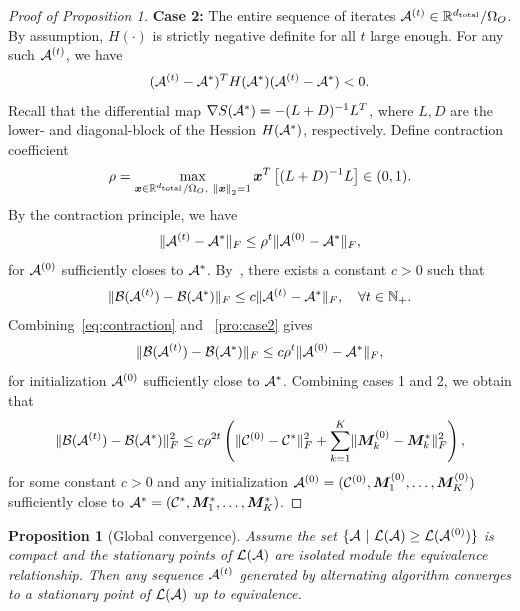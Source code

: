 \documentclass[11pt]{article}
\theoremstyle{plain}
\newtheorem{prop}{Proposition}
\theoremstyle{definition}
\begin{document}
\begin{proof}[Proof of Proposition 1]
\textbf{Case 2:} The entire sequence of iterates $\mathcal{A}^{(t)} \in \mathbb{R}^{d_{\text{total}}}/\Omega_O$. By assumption, $H(\cdot)$ is strictly negative definite for all $t$ large enough. For any such $\mathcal{A}^{(t)}$, we have 
\begin{align}\label{pro:3}
	(\mathcal{A}^{(t)} - \mathcal{A}^*)^T H(\mathcal{A}^*) (\mathcal{A}^{(t)} - \mathcal{A}^*) <0.
\end{align}
Recall that the differential map $\nabla S(\mathcal{A}^*) = -(L+D)^{-1} L^T$, where $L, D$ are the lower- and diagonal-block of the Hession $H(\mathcal{A}^*)$, respectively. Define contraction coefficient \[
\rho=\max_{\bm x \in  \mathbb{R}^{d_{\text{total}}}/\Omega_O,\ \left\lVert\bm x\right\rVert_2=1} \bm x^T \left[(L+D)^{-1}L\right] \in (0,1).
\]
By the contraction principle, we have
\begin{align}\label{eq:contraction}
	\lVert\mathcal{A}^{(t)}- \mathcal{A}^*\rVert_F \leq \rho^t \lVert\mathcal{A}^{(0)}-\mathcal{A}^*\rVert_F,
\end{align}
for $\mathcal{A}^{(0)}$ sufficiently closes to $\mathcal{A}^*$.
By~\citep[Lemma 3.1]{han2020optimal}, there exists a constant $c>0$ such that
\begin{align}\label{pro:case2}
	\lVert\mathcal{B}(\mathcal{A}^{(t)}) - \mathcal{B}(\mathcal{A}^*)\rVert_F \leq c\lVert\mathcal{A}^{(t)}- \mathcal{A}^*\rVert_F,\quad \forall t\in\mathbb{N}_{+}.
\end{align} 
Combining~\eqref{eq:contraction} and ~\eqref{pro:case2} gives
\[
\lVert\mathcal{B}(\mathcal{A}^{(t)}) - \mathcal{B}(\mathcal{A}^*)\rVert_F \leq c\rho^{t} \lVert\mathcal{A}^{(0)}-\mathcal{A}^*\rVert_F,
\]
for initialization $\mathcal{A}^{(0)}$ sufficiently close to $\mathcal{A}^*$. Combining cases 1 and 2, we obtain that 
\begin{align*}
	\lVert\mathcal{B}(\mathcal{A}^{(t)}) - \mathcal{B}(\mathcal{A}^*)\rVert_F^2 \leq c \rho^{2t}\left(\lVert\mathcal{C}^{(0)} - \mathcal{C}^*\rVert_F^2 + \sum_{k=1}^K \lVert\bm M^{(0)}_k - \bm M^*_k\rVert_F^2\right),
\end{align*}
for some constant $c>0$ and any initialization $\mathcal{A}^{(0)}=(\mathcal{C}^{(0)},\bm M^{(0)}_1,\ldots,\bm M^{(0)}_K)$ sufficiently close to $\mathcal{A}^*=(\mathcal{C}^{*},\bm M^{*}_1,\ldots,\bm M^{*}_K)$.

\end{proof}

\begin{prop}[Global convergence]
Assume the set $\{\mathcal{A}\ |\ \mathcal{L}(\mathcal{A}) \geq \mathcal{L}(\mathcal{A}^{(0)}) \}$ is compact and the stationary points of $\mathcal{L}(\mathcal{A})$ are isolated module the equivalence relationship. Then any sequence $\mathcal{A}^{(t)}$ generated by alternating algorithm converges to a stationary point of $\mathcal{L}(\mathcal{A})$ up to equivalence. 
\end{prop}
\end{document}
